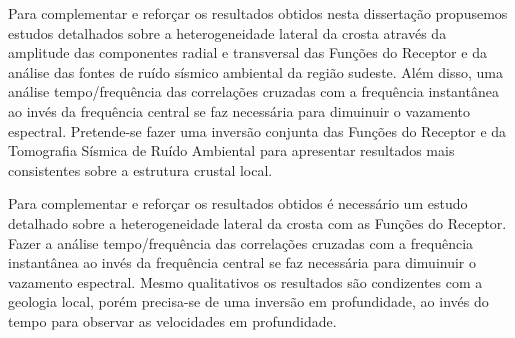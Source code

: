 Para complementar e reforçar os resultados obtidos nesta dissertação propusemos estudos detalhados sobre a heterogeneidade lateral da crosta através da amplitude das componentes radial e transversal das Funções do Receptor e da análise das fontes de ruído sísmico ambiental da região sudeste. Além disso, uma análise tempo/frequência das correlações cruzadas com a frequência instantânea ao invés da frequência central se faz necessária para dimuinuir o vazamento espectral. Pretende-se fazer uma inversão conjunta das Funções do Receptor e da Tomografia Sísmica de Ruído Ambiental para apresentar resultados mais consistentes sobre a estrutura crustal local.

Para complementar e reforçar os resultados obtidos é necessário um estudo detalhado sobre a heterogeneidade lateral da crosta com as Funções do Receptor.  Fazer a análise tempo/frequência das correlações cruzadas com a frequência instantânea ao invés da frequência central se faz necessária para dimuinuir o vazamento espectral. Mesmo qualitativos os resultados são condizentes com a geologia local, porém precisa-se de uma inversão em profundidade, ao invés do tempo para observar as velocidades em profundidade.